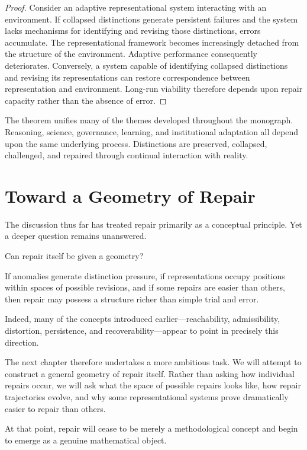 \documentclass[11pt,oneside,openany]{book}
\begin{document}
\begin{proof}

Consider an adaptive representational system interacting with an environment. If collapsed distinctions generate persistent failures and the system lacks mechanisms for identifying and revising those distinctions, errors accumulate. The representational framework becomes increasingly detached from the structure of the environment. Adaptive performance consequently deteriorates. Conversely, a system capable of identifying collapsed distinctions and revising its representations can restore correspondence between representation and environment. Long-run viability therefore depends upon repair capacity rather than the absence of error.

\end{proof}

The theorem unifies many of the themes developed throughout the monograph. Reasoning, science, governance, learning, and institutional adaptation all depend upon the same underlying process. Distinctions are preserved, collapsed, challenged, and repaired through continual interaction with reality.

\section{Toward a Geometry of Repair}

The discussion thus far has treated repair primarily as a conceptual principle. Yet a deeper question remains unanswered.

Can repair itself be given a geometry?

If anomalies generate distinction pressure, if representations occupy positions within spaces of possible revisions, and if some repairs are easier than others, then repair may possess a structure richer than simple trial and error.

Indeed, many of the concepts introduced earlier—reachability, admissibility, distortion, persistence, and recoverability—appear to point in precisely this direction.

The next chapter therefore undertakes a more ambitious task. We will attempt to construct a general geometry of repair itself. Rather than asking how individual repairs occur, we will ask what the space of possible repairs looks like, how repair trajectories evolve, and why some representational systems prove dramatically easier to repair than others.

At that point, repair will cease to be merely a methodological concept and begin to emerge as a genuine mathematical object.
\end{document}
